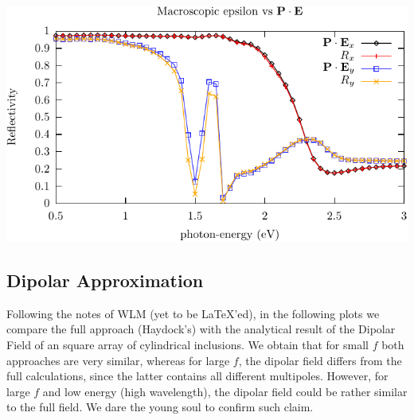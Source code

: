 \documentclass[preprint,12pt]{revtex4}
\begin{document}
\begin{center}
\includegraphics[scale=1]{plots/A0/pola}
\end{center}

\subsection{Dipolar Approximation}\label{dipole}

Following the notes of WLM (yet to be \LaTeX'ed), in the following
plots we compare the full approach (Haydock's) with the analytical
result of the Dipolar Field of an square array of cylindrical
inclusions. We obtain that for small $f$ both approaches are very
similar, whereas for large $f$, the dipolar field differs from the
full calculations, since the latter contains all different
multipoles. However, for large $f$ and low energy (high wavelength),
the dipolar field could be rather similar to the full field. We dare
the young soul to confirm such claim. 
\end{document}
